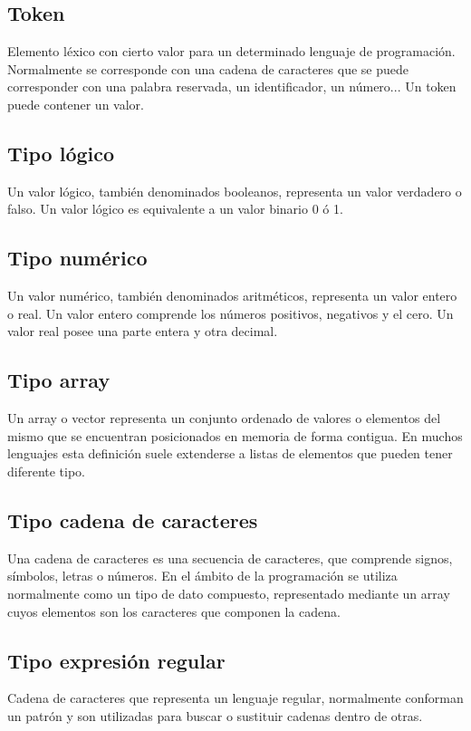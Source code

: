 \subsection{Token}
Elemento léxico con cierto valor para un determinado lenguaje de programación. Normalmente se corresponde con una cadena de
caracteres que se puede corresponder con una palabra reservada, un identificador, un número... Un token puede contener un 
valor.

\subsection {Tipo lógico}
Un valor lógico, también denominados booleanos, representa un valor verdadero o falso. Un valor lógico es equivalente a un valor binario 0 ó 1.

\subsection {Tipo numérico}
Un valor numérico, también denominados aritméticos, representa un valor entero o real. Un valor entero comprende los números positivos, negativos y el cero. Un valor real
posee una parte entera y otra decimal.

\subsection {Tipo array}
Un array o vector representa un conjunto ordenado de valores o elementos del mismo que se encuentran posicionados en memoria de forma contigua. En muchos lenguajes
esta definición suele extenderse a listas de elementos que pueden tener diferente tipo.

\subsection {Tipo cadena de caracteres}
Una cadena de caracteres es una secuencia de caracteres, que comprende signos, símbolos, letras o números. En el ámbito de la programación se utiliza normalmente como un tipo de 
dato compuesto, representado mediante un array cuyos elementos son los caracteres que componen la cadena.

\subsection {Tipo expresión regular}
Cadena de caracteres que representa un lenguaje regular, normalmente conforman un patrón y son utilizadas para buscar o 
sustituir cadenas dentro de otras. 

